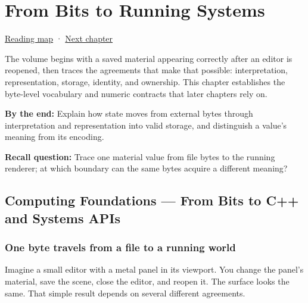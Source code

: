 \chapter{From Bits to Running Systems}\label{01-foundations-i-ch001-from-bits-to-running-systems}\hypertarget{01-foundations-i-ch001}{}\label{stagechapter:01-foundations-i-ch001}

\hypertarget{01-foundations-i-ch001-from-bits-to-running-systems}{}

\hyperref[volume-reading-map]{Reading map} · \hyperref[01-foundations-i-ch002-values-at-addresses-layout-lifetimes-and-representation]{Next chapter}

The volume begins with a saved material appearing correctly after an editor is reopened, then traces the agreements that make that possible: interpretation, representation, storage, identity, and ownership. This chapter establishes the byte-level vocabulary and numeric contracts that later chapters rely on.

\textbf{By the end:} Explain how state moves from external bytes through interpretation and representation into valid storage, and distinguish a value's meaning from its encoding.

\textbf{Recall question:} Trace one material value from file bytes to the running renderer; at which boundary can the same bytes acquire a different meaning?

\section{Computing Foundations --- From Bits to C++ and Systems APIs}\label{01-foundations-i-ch001-computing-foundations-from-bits-to-c-and-systems-apis}

\hypertarget{01-foundations-i-ch001-computing-foundations-from-bits-to-c-and-systems-apis}{}

\subsection{One byte travels from a file to a running world}\label{01-foundations-i-ch001-one-byte-travels-from-a-file-to-a-running-world}

\hypertarget{01-foundations-i-ch001-one-byte-travels-from-a-file-to-a-running-world}{}

Imagine a small editor with a metal panel in its viewport. You change the panel's material, save the scene, close the editor, and reopen it. The surface looks the same. That simple result depends on several different agreements.

